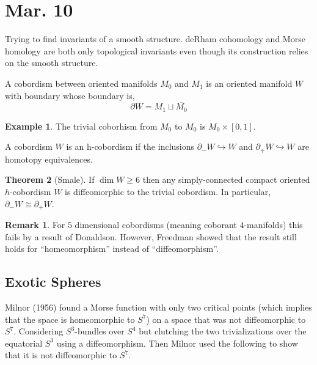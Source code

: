 \documentclass[12pt]{extarticle}
\theoremstyle{definition}
\newtheorem{theorem}{Theorem}[section]
\newtheorem{example}[theorem]{Example}
\newtheorem{remark}{Remark}
\newenvironment{definition}[1][Definition:]{\begin{trivlist}
\item[\hskip \labelsep {\bfseries #1}]}{\end{trivlist}}
\newcommand{\embed}{\hookrightarrow}
\begin{document}
\section{Mar. 10}

Trying to find invariants of a smooth structure. deRham cohomology and Morse homology are both only topological invariants even though its construction relies on the smooth structure. 

\begin{definition}
A cobordism between oriented manifolds $M_0$ and $M_1$ is an oriented manifold $W$ with boundary whose boundary is,
\[ \partial W = M_1 \sqcup \overline{M_0} \] 
\end{definition}

\begin{example}
The trivial coborhism from $M_0$ to $M_0$ is $M_0 \times [0,1]$.
\end{example}

\begin{definition}
A cobordism $W$ is an h-cobordism if the inclusions $\partial_- W \embed W$ and $\partial_+ W \embed W$ are homotopy equivalences. 
\end{definition}

\begin{theorem}[Smale]
If $\dim{W} \ge 6$ then any simply-connected compact oriented $h$-cobordism $W$ is diffeomorphic to the trivial cobordism. In particular, $\partial_- W \cong \partial_+ W$. 
\end{theorem}

\begin{remark}
For $5$ dimensional cobordisms (meaning coborant $4$-manifolds) this fails by a result of Donaldson. However, Freedman showed that the result still holds for ``homeomorphism'' instead of ``diffeomorphism''.
\end{remark}

\subsection{Exotic Spheres}

Milnor (1956) found a Morse function with only two critical points (which implies that the space is homeomorphic to $S^7$) on a space that was not diffeomorphic to $S^7$. Considering $S^3$-bundles over $S^4$ but clutching the two trivializations over the equatorial $S^3$ using a diffeomorphism. Then Milnor used the following to show that it is not diffeomorphic to $S^7$.
\end{document}
